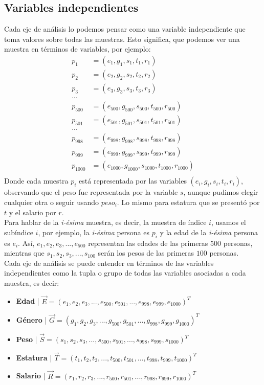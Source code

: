 \documentclass{article}
\begin{document}
\subsection{Variables independientes}

Cada eje de análisis lo podemos pensar como una variable independiente que toma valores sobre todas las muestras. Esto significa, que podemos ver una muestra en términos de variables, por ejemplo:
\begin{equation}
    \begin{aligned}
        p_1 &= (e_1, g_1, s_1, t_1, r_1) \\
        p_2 &= (e_2, g_2, s_2, t_2, r_2) \\
        p_3 &= (e_3, g_3, s_3, t_3, r_3) \\
        ... \\
        p_{500} &= (e_{500}, g_{500}, s_{500}, t_{500}, r_{500}) \\
        p_{501} &= (e_{501}, g_{501}, s_{501}, t_{501}, r_{501}) \\
        ... \\
        p_{998} &= (e_{998}, g_{998}, s_{998}, t_{998}, r_{998}) \\
        p_{999} &= (e_{999}, g_{999}, s_{999}, t_{999}, r_{999}) \\
        p_{1000} &= (e_{1000}, g_{1000}, s_{1000}, t_{1000}, r_{1000}) \\
    \end{aligned}
\end{equation}
Donde cada muestra $p_i$ está representada por las variables $(e_i, g_i, s_i, t_i, r_i)$, observando que el peso fue representada por la variable $s$, aunque pudimos elegir cualquier otra o seguir usando $peso_i$. Lo mismo para estatura que se presentó por $t$ y el salario por $r$.
\\[12pt]
Para hablar de la \textit{i-ésima} muestra, es decir, la muestra de índice $i$, usamos el subíndice $i$, por ejemplo, la \textit{i-ésima} persona es $p_i$ y la edad de la \textit{i-ésima} persona es $e_i$. Así, $e_1, e_2, e_3, ..., e_{500}$ representan las edades de las primeras $500$ personas, mientras que $s_1, s_2, s_3, ..., s_{100}$ serán los pesos de las primeras $100$ personas.
\\[12pt]
Cada eje de análisis se puede entender en términos de las variables independientes como la tupla o grupo de todas las variables asociadas a cada muestra, es decir:
\begin{itemize}
    \item \textbf{Edad} | $\vec{E} = (e_1, e_2, e_3, ..., e_{500}, e_{501}, ..., e_{998}, e_{999}, e_{1000})^T$
    \item \textbf{Género} | $\vec{G} = (g_1, g_2, g_3, ..., g_{500}, g_{501}, ..., g_{998}, g_{999}, g_{1000})^T$
    \item \textbf{Peso} | $\vec{S} = (s_1, s_2, s_3, ..., s_{500}, s_{501}, ..., s_{998}, s_{999}, s_{1000})^T$
    \item \textbf{Estatura} | $\vec{T} = (t_1, t_2, t_3, ..., t_{500}, t_{501}, ..., t_{998}, t_{999}, t_{1000})^T$
    \item \textbf{Salario} | $\vec{R} = (r_1, r_2, r_3, ..., r_{500}, r_{501}, ..., r_{998}, r_{999}, r_{1000})^T$
\end{itemize}
\end{document}
